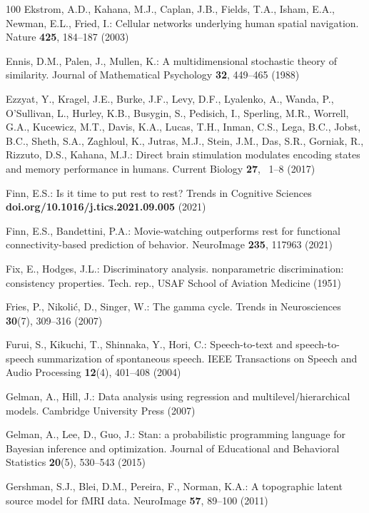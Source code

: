 \documentclass[runningheads]{llncs}
\begin{document}
\begin{thebibliography}{100}
Ekstrom, A.D., Kahana, M.J., Caplan, J.B., Fields, T.A., Isham, E.A., Newman,
  E.L., Fried, I.: Cellular networks underlying human spatial navigation.
  Nature  \textbf{425},  184--187 (2003)

Ennis, D.M., Palen, J., Mullen, K.: A multidimensional stochastic theory of
  similarity. Journal of Mathematical Psychology  \textbf{32},  449--465 (1988)

Ezzyat, Y., Kragel, J.E., Burke, J.F., Levy, D.F., Lyalenko, A., Wanda, P.,
  O'Sullivan, L., Hurley, K.B., Busygin, S., Pedisich, I., Sperling, M.R.,
  Worrell, G.A., Kucewicz, M.T., Davis, K.A., Lucas, T.H., Inman, C.S., Lega,
  B.C., Jobst, B.C., Sheth, S.A., Zaghloul, K., Jutras, M.J., Stein, J.M., Das,
  S.R., Gorniak, R., Rizzuto, D.S., Kahana, M.J.: Direct brain stimulation
  modulates encoding states and memory performance in humans. Current Biology
  \textbf{27}, ~1--8 (2017)

Finn, E.S.: Is it time to put rest to rest? Trends in Cognitive Sciences
  \textbf{doi.org/10.1016/j.tics.2021.09.005} (2021)

Finn, E.S., Bandettini, P.A.: Movie-watching outperforms rest for functional
  connectivity-based prediction of behavior. {NeuroImage}  \textbf{235},
  117963 (2021)

Fix, E., Hodges, J.L.: Discriminatory analysis. nonparametric discrimination:
  consistency properties. Tech. rep., USAF School of Aviation Medicine (1951)

Fries, P., Nikoli{\'c}, D., Singer, W.: The gamma cycle. Trends in
  Neurosciences  \textbf{30}(7),  309--316 (2007)

Furui, S., Kikuchi, T., Shinnaka, Y., Hori, C.: Speech-to-text and
  speech-to-speech summarization of spontaneous speech. {IEEE} Transactions on
  Speech and Audio Processing  \textbf{12}(4),  401--408 (2004)

Gelman, A., Hill, J.: Data analysis using regression and
  multilevel/hierarchical models. Cambridge {University} Press (2007)

Gelman, A., Lee, D., Guo, J.: Stan: a probabilistic programming language for
  {Bayesian} inference and optimization. Journal of Educational and Behavioral
  Statistics  \textbf{20}(5),  530--543 (2015)

Gershman, S.J., Blei, D.M., Pereira, F., Norman, K.A.: A topographic latent
  source model for {fMRI} data. {NeuroImage}  \textbf{57},  89--100 (2011)


\end{thebibliography}
\end{document}
